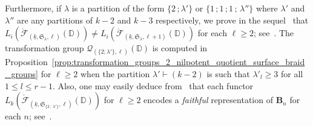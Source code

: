 \documentclass[AHL,Unicode,published]{cedram}
\newcommand{\Int}{\mathring}
\newcommand{\B}{\ensuremath{\mathbf{B}}}
\newcommand{\Sym}{\mathfrak{S}}
\newcommand{\cF}{\mathcal{F}}
\newcommand{\cQ}{\mathcal{Q}}
\newcommand{\bD}{\mathbb{D}}
\renewcommand{\geq}{\geqslant}
\renewcommand{\leq}{\leqslant}
\begin{document}
Furthermore, if $\lambda$ is a partition of the form $\boldsymbol{\{}2\,;\lambda'\boldsymbol{\}}$ or $\boldsymbol{\{}1\,;1\,;1\,;\,\lambda''\boldsymbol{\}}$ where $\lambda'$ and $\lambda''$ are any partitions of $k-2$ and $k-3$ respectively, we prove in the sequel~\cite{PSIN} that $L_{i}(\Int{\cF}_{(\underline{k},\Sym_{\lambda},\ell)}(\bD))\neq L_{i}(\Int{\cF}_{(\underline{k},\Sym_{\lambda},\ell + 1)}(\bD))$ for each $\ell \geq 2$; see~\cite[Table~2]{PSIN}. The transformation group $\cQ_{(\boldsymbol{\{}2;\lambda'\boldsymbol{\}},\ell)}(\bD)$ is computed in Proposition~\ref{prop:transformation_groups_2_nilpotent_quotient_surface_braid_groups} for $\ell\geq 2$ when the partition $\lambda' \vdash (k-2)$ is such that $\lambda'_{l}\geq 3$ for all $1\leq l\leq r-1$. Also, one may easily deduce from~\cite[Th.~1.1]{bigelow2001braid} that each functor $L_{k}(\Int{\cF}_{(\underline{k},\Sym_{\boldsymbol{\{}2\,;\,\lambda'\boldsymbol{\}}},\ell)}(\bD))$ for $\ell\geq 2$ encodes a \emph{faithful} representation of $\B_{n}$ for each $n$; see~\cite[Rem.~4.8]{PSIN}.
\end{document}
